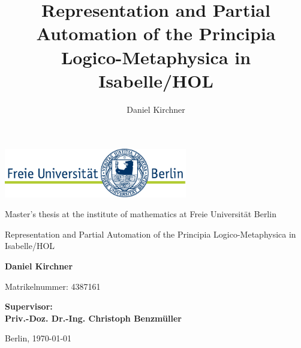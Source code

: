 \documentclass[a4paper,enabledeprecatedfontcommands,abstract=on,twoside=true,bibliography=totoc]{scrreprt}
\title{Representation and Partial Automation of the
Principia Logico-Metaphysica in Isabelle/HOL}
\author{Daniel Kirchner}
\numberwithin{TODO}{chapter}
\numberwithin{equation}{section}
\begin{document}
\begin{titlepage}
\vspace{1cm}

\begin{center}
    \includegraphics[width=0.6\textwidth]{logo}
    \vspace{1cm}


Master's thesis at the institute of mathematics at Freie Universit\"at Berlin

    \vspace{2cm}


    \Large{\textsf{Representation and Partial Automation of the Principia Logico-Metaphysica in Isabelle/HOL}}

    \vspace{2cm}

    \large{\textbf{Daniel Kirchner}}

	\vspace{0.25cm}

	\small{Matrikelnummer: 4387161}

    \vspace{2cm}

    \large{\textbf{
        Supervisor:\\
Priv.-Doz. Dr.-Ing. Christoph Benzm\"uller
    }}

    \vspace{2cm}
    \large{Berlin, \today}
\end{center}
\end{titlepage}

\cleardoublepage
\end{document}
